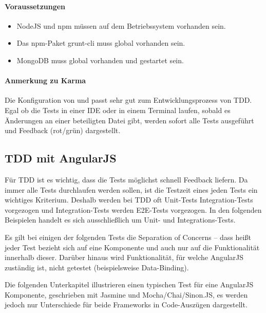 \paragraph{Voraussetzungen}
\begin{itemize}
 \item NodeJS und npm müssen auf dem Betriebssystem vorhanden sein.
 \item Das npm-Paket grunt-cli muss global vorhanden sein.
 \item MongoDB muss global vorhanden und gestartet sein.
\end{itemize}

\paragraph{Anmerkung zu Karma}
Die Konfiguration von  und  passt sehr gut zum Entwicklungsprozess von TDD. Egal ob die Tests in einer IDE oder in einem Terminal laufen, sobald es Änderungen an einer beteiligten Datei gibt, werden sofort alle Tests ausgeführt und Feedback (rot/grün) dargestellt.

\newpage
\subsection{TDD mit AngularJS}
Für TDD ist es wichtig, dass die Tests möglichst schnell Feedback liefern. Da immer alle Tests durchlaufen werden sollen, ist die Testzeit eines jeden Tests ein wichtiges Kriterium. Deshalb werden bei TDD oft Unit-Tests Integration-Tests vorgezogen und Integration-Tests werden E2E-Tests vorgezogen. In den folgenden Beispielen handelt es sich ausschließlich um Unit- und Integrations-Tests.

Es gilt bei einigen der folgenden Tests die Separation of Concerns -- dass heißt jeder Test bezieht sich auf eine Komponente und auch nur auf die Funktionalität innerhalb dieser. Darüber hinaus wird Funktionalität, für welche AngularJS zuständig ist, nicht getestet (beispielsweise Data-Binding).

Die folgenden Unterkapitel illustrieren einen typischen Test für eine AngularJS Komponente, geschrieben mit Jasmine und Mocha/Chai/Sinon.JS, es werden jedoch nur Unterschiede für beide Frameworks in Code-Auszügen dargestellt.

